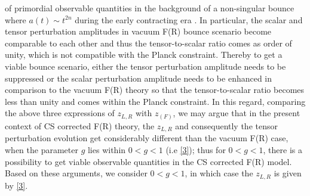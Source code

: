 \documentclass{article}
\begin{document}
 of primordial observable quantities in the background of a non-singular bounce where $a(t) \sim t^{2n}$ during the early contracting era 
 \cite{Odintsov:2014gea,Nojiri:2019lqw}. 
 In particular, the scalar and tensor perturbation amplitudes in vacuum F(R) bounce scenario become comparable 
 to each other and thus the tensor-to-scalar ratio comes as order of unity, which is not compatible with the Planck constraint. Thereby 
 to get a viable bounce scenario, either the tensor perturbation amplitude needs to be suppressed or the scalar perturbation amplitude needs to be 
 enhanced in comparison to the vacuum F(R) theory so that 
 the tensor-to-scalar ratio becomes less than unity and comes within the Planck constraint. In 
 this regard, comparing the above three expressions of $z_{L,R}$ with $z_{(F)}$, we may argue that 
 in the present context of CS corrected F(R) theory, the $z_{L,R}$ and consequently the tensor perturbation evolution get 
 considerably different than the vacuum F(R) case, when the parameter $g$ lies within $0 < g < 1$ (i.e \ref{3}); thus for $0<g<1$, there is a 
 possibility to get viable observable quantities in the CS corrected F(R) model. Based on these arguments, we consider 
 $0 < g < 1$, in which case the $z_{L,R}$ is given by \ref{3}. 
 
\end{document}
